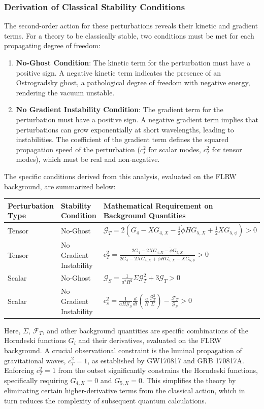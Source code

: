 \documentclass[twocolumn]{aastex631}
\begin{document}
\subsubsection{Derivation of Classical Stability Conditions}
The second-order action for these perturbations reveals their kinetic and gradient terms. For a theory to be classically stable, two conditions must be met for each propagating degree of freedom:
\begin{enumerate}
    \item \textbf{No-Ghost Condition}: The kinetic term for the perturbation must have a positive sign. A negative kinetic term indicates the presence of an Ostrogradsky ghost, a pathological degree of freedom with negative energy, rendering the vacuum unstable.
    \item \textbf{No Gradient Instability Condition}: The gradient term for the perturbation must have a positive sign. A negative gradient term implies that perturbations can grow exponentially at short wavelengths, leading to instabilities. The coefficient of the gradient term defines the squared propagation speed of the perturbation ($c_s^2$ for scalar modes, $c_T^2$ for tensor modes), which must be real and non-negative.
\end{enumerate}
The specific conditions derived from this analysis, evaluated on the FLRW background, are summarized below:

\begin{tabular}{|l|l|l|}
\hline
\textbf{Perturbation Type} & \textbf{Stability Condition} & \textbf{Mathematical Requirement on Background Quantities} \\
\hline
Tensor & No-Ghost & $\mathcal{G}_T = 2(G_4 - X G_{4,X} - \frac{1}{2}\dot{\phi} H G_{5,X} + \frac{1}{2}X G_{5,\phi}) > 0$ \\
\hline
Tensor & No Gradient Instability & $c_T^2 = \frac{2G_4 - 2X G_{4,X} - \ddot{\phi} G_{5,X}}{2G_4 - 2X G_{4,X} + \dot{\phi} H G_{5,X} - X G_{5,\phi}} > 0$ \\
\hline
Scalar & No-Ghost & $\mathcal{G}_S = \frac{1}{a^2 H^2} \Sigma \mathcal{G}_T^2 + 3 \mathcal{G}_T > 0$ \\
\hline
Scalar & No Gradient Instability & $c_s^2 = \frac{1}{aH\mathcal{G}_S} \frac{d}{dt}\left( \frac{a}{H} \frac{\mathcal{G}_T^2}{\Sigma} \right) - \frac{\mathcal{F}_T}{\mathcal{G}_S} > 0$ \\
\hline
\end{tabular}

Here, $\Sigma$, $\mathcal{F}_T$, and other background quantities are specific combinations of the Horndeski functions $G_i$ and their derivatives, evaluated on the FLRW background. A crucial observational constraint is the luminal propagation of gravitational waves, $c_T^2=1$, as established by GW170817 and GRB 170817A. Enforcing $c_T^2=1$ from the outset significantly constrains the Horndeski functions, specifically requiring $G_{4,X}=0$ and $G_{5,X}=0$. This simplifies the theory by eliminating certain higher-derivative terms from the classical action, which in turn reduces the complexity of subsequent quantum calculations.
\end{document}
